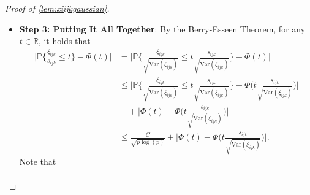 \documentclass[10pt]{article}
\newcommand{\0}{{\mathbf{0}}}
\newcommand{\1}{{\mathbf{1}}}
\renewcommand{\t}{^{\top}}
\newcommand{\p}{\mathbb{P}}
\begin{document}
\begin{proof}[Proof of \cref{lem:xiijkgaussian}]
\begin{itemize}
\begin{align*}
    &\lesssim \frac{1}{cs_{ijk}^3} \sigma^3 \frac{\mu_0^2 r}{p^2} \bigg( \| \mathbf{V}_1 \mathbf{V}_1\t e_{(j-1)p_3 + k} \|^2 + \| \mathbf{V}_2 \mathbf{V}_2\t e_{(k-1)p_1 + i} \|^2 + \| \mathbf{V}_3 \mathbf{V}_3\t e_{(i-1)p_2 + j} \|^2 \bigg)  \\
    &\lesssim \frac{\mu_0^2 r}{p^2} \frac{\sigma^3}{\sigma_{\min}^3} \ \bigg( \left\|e_{(j-1) p_{3}+k}^{\top} \mathbf{V}_{1}\right\|^{2}+\left\|e_{(k-1) p_{1}+i}^{\top} \mathbf{V}_{2}\right\|^{2}+\left\|e_{(i-1) p_{2}+j} \mathbf{V}_{3}\right\|^{2} \bigg)^{-1/2} \\
    &\lesssim \frac{\mu_0^2 r}{p^2} \bigg( \left\|e_{(j-1) p_{3}+k}^{\top} \mathbf{V}_{1}\right\|^{2}+\left\|e_{(k-1) p_{1}+i}^{\top} \mathbf{V}_{2}\right\|^{2}+\left\|e_{(i-1) p_{2}+j} \mathbf{V}_{3}\right\|^{2} \bigg)^{-1/2} \\
    &\lesssim \frac{\mu_0^2 r }{p^2} \frac{p^{3/2}}{\kappa \mu_0^3 r^{3/2} \sqrt{\log(p)}} \\
    &\lesssim \frac{1}{\sqrt{p\log(p)}},
\end{align*}
where we have used the condition 
\begin{align*}
     \bigg( \left\|e_{(j-1) p_{3}+k}^{\top} \mathbf{V}_{1}\right\|^{2}+\left\|e_{(k-1) p_{1}+i}^{\top} \mathbf{V}_{2}\right\|^{2}+\left\|e_{(i-1) p_{2}+j} \mathbf{V}_{3}\right\|^{2} \bigg)^{1/2} \gg \frac{\kappa \mu_0^3 r^{3/2} \sqrt{\log(p)}}{p^{3/2}}.
\end{align*}
\item 
\textbf{Step 3: Putting It All Together}: 
By the Berry-Esseen Theorem, for any $t \in \mathbb{R}$, it holds that
\begin{align*}
   \Bigg| \p\bigg\{ \frac{\xi_{ijk}}{s_{ijk}} \leq t \bigg\} - \Phi(t) \Bigg| &=  \Bigg| \p\bigg\{ \frac{\xi_{ijk}}{\sqrt{\mathrm{Var}(\xi_{ijk})}} \leq t \frac{s_{ijk}}{\sqrt{\mathrm{Var}(\xi_{ijk})}} \bigg\} - \Phi(t) \bigg| \\
    &\leq  \bigg| \p\bigg\{ \frac{\xi_{ijk}}{\sqrt{\mathrm{Var}(\xi_{ijk})}} \leq t \frac{s_{ijk}}{\sqrt{\mathrm{Var}(\xi_{ijk})}} \bigg\} - \Phi\bigg( t \frac{s_{ijk}}{\sqrt{\mathrm{Var}(\xi_{ijk})}} \bigg) \bigg| \\
    &\quad + \bigg| \Phi(t) - \Phi\bigg( t \frac{s_{ijk}}{\sqrt{\mathrm{Var}(\xi_{ijk})}} \bigg) \bigg| \\
    &\leq \frac{C}{\sqrt{p\log(p)}}  + \bigg| \Phi(t) - \Phi\bigg( t \frac{s_{ijk}}{\sqrt{\mathrm{Var}(\xi_{ijk})}} \bigg) \bigg|.
    \end{align*}
    Note that 
    \begin{align*}

\end{align*}
\end{itemize}
\end{proof}
\end{document}
